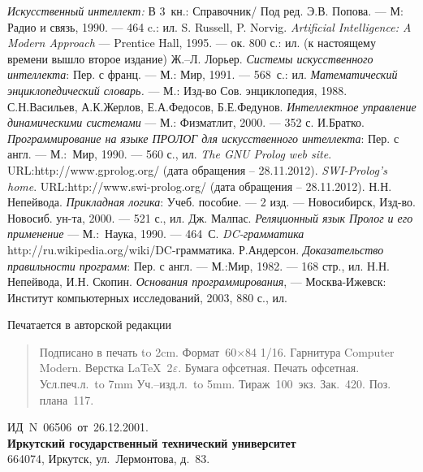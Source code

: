 \documentclass[12pt, openany, twoside]{book} %
\begin{document}
\begin{thebibliography}{99}
 \emph{Искусственный интеллект:} В 3~кн.:
Справочник/ Под ред. Э.В. Попова. --- М: Радио и связь, 1990. --- 464 c.: ил.
 S. Russell, P. Norvig. \emph{Artificial Intelligence: A Modern Approach} --- Prentice Hall, 1995. --- ок. 800 с.: ил. (к настоящему времени вышло второе издание)
 Ж.--Л. Лорьер. \emph{Системы искусственного
интеллекта}: Пер. с франц. --- М.: Мир, 1991. --- 568~с.: ил.
 \emph{Математический энциклопедический словарь.} ---
М.: Изд-во Сов. энциклопедия, 1988.
 С.Н.Васильев, А.К.Жерлов, Е.А.Федосов, Б.Е.Федунов.
\emph{Интеллектное управление динамическими системами} --- М.:
Физматлит, 2000. --- 352 с.
 И.Братко. \emph{Программирование на языке ПРОЛОГ для
искусственного интеллекта}: Пер. с англ. --- М.:~Мир, 1990. --- 560 с., ил.
 \emph{The GNU Prolog web site}. URL:http://www.gprolog.org/ (дата обращения -- 28.11.2012).
 \emph{SWI-Prolog's home}. URL:http://www.swi-prolog.org/ (дата обращения -- 28.11.2012).
 Н.Н. Непейвода. \emph{Прикладная логика}: Учеб. пособие.
--- 2 изд. --- Новосибирск, Изд-во. Новосиб. ун-та, 2000. --- 521 с., ил.
 Дж. Малпас. \emph{Реляционный язык Пролог и его применение} ---
М.:~Наука, 1990. --- 464~С.
 \emph{DC-грамматика} http://ru.wikipedia.org/wiki/DC-грамматика.
 Р.Андерсон. \emph{Доказательство правильности программ}:
Пер. с англ. --- М.:Мир, 1982. --- 168 стр., ил.
Н.Н. Непейвода, И.Н. Скопин. \emph{Основания программирования}, — Москва-Ижевск: Институт компьютерных исследований, 2003, 880 с., ил.
\end{thebibliography}
\label{pg:lastpage}

\newpage
\thispagestyle{empty}
\hbox{}
\vfill
\begin{center}
Печатается в авторской редакции\\[1em]
\end{center}
\begin{quote}
\noindent Подписано в печать \hbox to 2cm{}.
Формат~60$\times$84 1/16. Гарнитура Computer Modern.
Верстка \LaTeX~2$\varepsilon$.
Бумага офсетная. Печать офсетная. Усл.печ.л.~\hbox to 7mm{}
Уч.--изд.л.~\hbox to 5mm{}. Тираж~100~экз. Зак.~420.
Поз. плана~117.
\end{quote}
\begin{center}
ИД~N~06506~от~26.12.2001.\\
{\bf Иркутский государственный технический университет}\\
664074, Иркутск, ул.~Лермонтова, д.~83.
\end{center}
\end{document}
